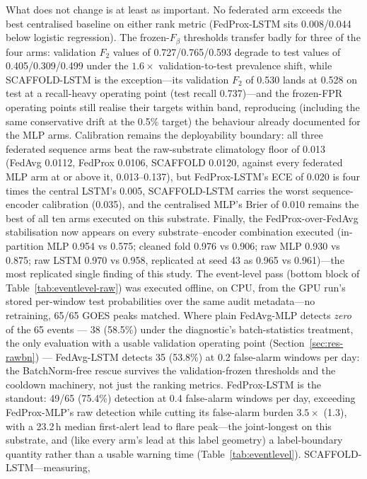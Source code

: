 What does not change is at least as important. No federated arm
exceeds the best centralised baseline on either rank metric
(FedProx-LSTM sits 0.008/0.044 below logistic regression). The
frozen-$F_\beta$ thresholds transfer badly for three of the four
arms: validation $F_2$ values of 0.727/0.765/0.593 degrade to test
values of 0.405/0.309/0.499 under the $1.6\times$ validation-to-test
prevalence shift, while SCAFFOLD-LSTM is the exception---its
validation $F_2$ of 0.530 lands at 0.528 on test at a recall-heavy
operating point (test recall 0.737)---and the frozen-FPR operating
points still realise their targets within band, reproducing
(including the same conservative drift at the 0.5\% target) the
behaviour already documented for the MLP arms. Calibration remains
the deployability boundary: all three federated sequence arms beat
the raw-substrate climatology floor of 0.013 (FedAvg 0.0112,
FedProx 0.0106, SCAFFOLD 0.0120, against every federated MLP arm at
or above it, 0.013--0.137), but FedProx-LSTM's ECE of 0.020 is four
times the central LSTM's 0.005, SCAFFOLD-LSTM carries the worst
sequence-encoder calibration (0.035), and the centralised MLP's
Brier of 0.010 remains the best of all ten arms executed on this
substrate. Finally, the FedProx-over-FedAvg stabilisation now
appears on every substrate--encoder combination executed
(in-partition MLP 0.954 vs 0.575; cleaned fold 0.976 vs 0.906; raw
MLP 0.930 vs 0.875; raw LSTM 0.970 vs
0.958, replicated at seed 43 as 0.965 vs 0.961)---the most
replicated single finding of this study. The
event-level pass (bottom block of Table~\ref{tab:eventlevel-raw})
was executed offline, on CPU, from the GPU run's stored per-window
test probabilities over the same audit metadata---no retraining,
65/65 GOES peaks matched. Where plain FedAvg-MLP detects \emph{zero}
of the 65 events --- 38 (58.5\%) under the diagnostic's
batch-statistics treatment, the only evaluation with a usable
validation operating point (Section~\ref{sec:res-rawbn}) ---
FedAvg-LSTM detects 35 (53.8\%) at 0.2
false-alarm windows per day: the BatchNorm-free rescue survives the
validation-frozen thresholds and the cooldown machinery, not just
the ranking metrics. FedProx-LSTM is the standout: 49/65 (75.4\%)
detection at 0.4 false-alarm windows per day, exceeding
FedProx-MLP's raw detection while cutting its false-alarm burden
$3.5\times$ (1.3), with a 23.2\,h median first-alert lead to flare
peak---the joint-longest on this substrate, and (like every arm's
lead at this label geometry) a label-boundary quantity rather than a
usable warning time (Table~\ref{tab:eventlevel}). SCAFFOLD-LSTM---measuring,
